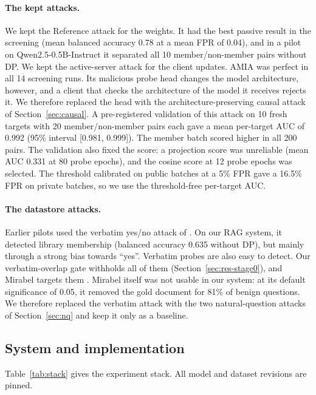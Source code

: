 \documentclass[11pt]{article}
\begin{document}
\paragraph{The kept attacks.} We kept the Reference attack for the weights. It had the best passive result in the screening (mean balanced accuracy 0.78 at a mean FPR of 0.04), and in a pilot on Qwen2.5-0.5B-Instruct it separated all 10 member/non-member pairs without DP. We kept the active-server attack for the client updates. AMIA was perfect in all 14 screening runs. Its malicious probe head changes the model architecture, however, and a client that checks the architecture of the model it receives rejects it. We therefore replaced the head with the architecture-preserving causal attack of Section~\ref{sec:causal}. A pre-registered validation of this attack on 10 fresh targets with 20 member/non-member pairs each gave a mean per-target AUC of 0.992 (95\% interval [0.981, 0.999]). The member batch scored higher in all 200 pairs. The validation also fixed the score: a projection score was unreliable (mean AUC 0.331 at 80 probe epochs), and the cosine score at 12 probe epochs was selected. The threshold calibrated on public batches at a 5\% FPR gave a 16.5\% FPR on private batches, so we use the threshold-free per-target AUC.

\paragraph{The datastore attacks.} Earlier pilots used the verbatim yes/no attack of \citet{anderson2024membership}. On our RAG system, it detected library membership (balanced accuracy 0.635 without DP), but mainly through a strong bias towards ``yes''. Verbatim probes are also easy to detect. Our verbatim-overlap gate withholds all of them (Section~\ref{sec:res-stage0}), and Mirabel targets them \citep{choi2025mirabel}. Mirabel itself was not usable in our system: at its default significance of 0.05, it removed the gold document for 81\% of benign questions. We therefore replaced the verbatim attack with the two natural-question attacks of Section~\ref{sec:nq} and keep it only as a baseline.

\subsection{System and implementation}\label{sec:framework}

Table~\ref{tab:stack} gives the experiment stack. All model and dataset revisions are pinned.
\end{document}
